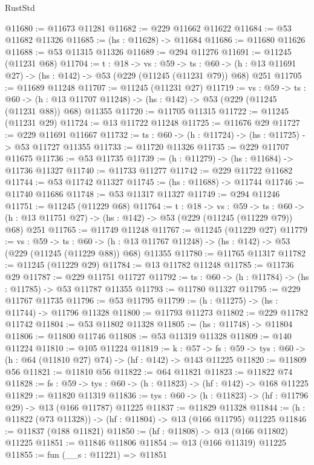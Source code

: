 \begin{lexlean}{RustStd}
\begin{coremodule}
@11680 := @11673 @11281
@11682 := @229 @11662 @11622
@11684 := @53 @11682 @11326
@11685 := (hs : @11628) -> @11684
@11686 := @11680 @11626
@11688 := @53 @11315 @11326
@11689 := @294 @11276
@11691 := @11245 (@11231 @68)
@11704 := {t : @18} ->
  {vs : @59} ->
  {ts : @60} -> (h : @13 @11691 @27) -> (hs : @142) -> @53 (@229 (@11245 (@11231 @79)) @68) @251
@11705 := @11689 @11248
@11707 := @11245 (@11231 @27)
@11719 := {vs : @59} ->
  {ts : @60} ->
  (h : @13 @11707 @11248) -> (hs : @142) -> @53 (@229 (@11245 (@11231 @88)) @68) @11355
@11720 := @11705 @11315
@11722 := @11245 (@11231 @29)
@11724 := @13 @11722 @11248
@11725 := @11676 @29
@11727 := @229 @11691 @11667
@11732 := {ts : @60} -> (h : @11724) -> (hs : @11725) -> @53 @11727 @11355
@11733 := @11720 @11326
@11735 := @229 @11707 @11675
@11736 := @53 @11735
@11739 := (h : @11279) -> (hs : @11684) -> @11736 @11327
@11740 := @11733 @11277
@11742 := @229 @11722 @11682
@11744 := @53 @11742 @11327
@11745 := (hs : @11688) -> @11744
@11746 := @11740 @11686
@11748 := @53 @11317 @11327
@11749 := @294 @11246
@11751 := @11245 (@11229 @68)
@11764 := {t : @18} ->
  {vs : @59} ->
  {ts : @60} -> (h : @13 @11751 @27) -> (hs : @142) -> @53 (@229 (@11245 (@11229 @79)) @68) @251
@11765 := @11749 @11248
@11767 := @11245 (@11229 @27)
@11779 := {vs : @59} ->
  {ts : @60} ->
  (h : @13 @11767 @11248) -> (hs : @142) -> @53 (@229 (@11245 (@11229 @88)) @68) @11355
@11780 := @11765 @11317
@11782 := @11245 (@11229 @29)
@11784 := @13 @11782 @11248
@11785 := @11736 @29
@11787 := @229 @11751 @11727
@11792 := {ts : @60} -> (h : @11784) -> (hs : @11785) -> @53 @11787 @11355
@11793 := @11780 @11327
@11795 := @229 @11767 @11735
@11796 := @53 @11795
@11799 := (h : @11275) -> (hs : @11744) -> @11796 @11328
@11800 := @11793 @11273
@11802 := @229 @11782 @11742
@11804 := @53 @11802 @11328
@11805 := (hs : @11748) -> @11804
@11806 := @11800 @11746
@11808 := @53 @11319 @11328
@11809 := @140 @11224
@11810 := @105 @11224
@11819 := {k : @57} ->
  {fs : @59} -> {tys : @60} -> (h : @64 (@11810 @27) @74) -> (hf : @142) -> @143 @11225
@11820 := @11809 @56
@11821 := @11810 @56
@11822 := @64 @11821
@11823 := @11822 @74
@11828 := {fs : @59} -> {tys : @60} -> (h : @11823) -> (hf : @142) -> @168 @11225
@11829 := @11820 @11319
@11836 := {tys : @60} -> (h : @11823) -> (hf : @11796 @29) -> @13 (@166 @11787) @11225
@11837 := @11829 @11328
@11844 := (h : @11822 (@73 @11328)) -> (hf : @11804) -> @13 (@166 @11795) @11225
@11846 := @11837 (@188 @11821)
@11850 := (hf : @11808) -> @13 (@166 @11802) @11225
@11851 := @11846 @11806
@11854 := @13 (@166 @11319) @11225
@11855 := fun (__s : @11221) => @11851

\end{coremodule}
\end{lexlean}
